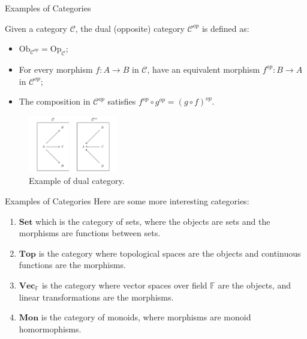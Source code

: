 \documentclass[aspectratio=169,xcolor=dvipsnames,10pt]{beamer}
\theoremstyle{definition}
\begin{document}
\begin{frame}[fragile]{Examples of Categories}
    \begin{definition}
        Given a category $\mathcal C$, the dual (opposite) category $\mathcal C^{op}$ is defined as:
        \begin{itemize}
            \item $\text{Ob}_{\mathcal C^{op}} = \text{Op}_\mathcal C$;
            \item For every morphism $f:A\to B$ in $\mathcal C$, have an equivalent morphism $f^{op}:B \to A$ in $\mathcal C^{op}$;
            \item The composition in $\mathcal C^{op}$ satisfies $f^{op} \circ g^{op} = (g \circ f)^{op}$.
        \end{itemize}
    \end{definition}
	\begin{figure}[H]
		\begin{center}
			\includegraphics[width=0.35\textwidth]{../notebooks/DualCategory.pdf}
		\end{center}
		\caption{Example of dual category.}
		\label{fig:dual}
	\end{figure}
\end{frame}

\begin{frame}[fragile]{Examples of Categories}
	Here are some more interesting
	categories:
	\begin{enumerate}[1.]
		\item $\mathbf{Set}$ which is the category of sets, where the objects are sets and the morphisms are functions between sets.
		\item $\mathbf{Top}$ is the category where topological spaces are the objects and continuous functions are the morphisms.
		\item $\mathbf{Vec}_\mathbb F$ is the category where vector spaces over field $\mathbb F$ are the objects,
		      and linear transformations are the morphisms.
		\item $\mathbf{Mon}$ is the category of monoids, where morphisms are monoid homormophisms.
	\end{enumerate}
\end{frame}
\end{document}

